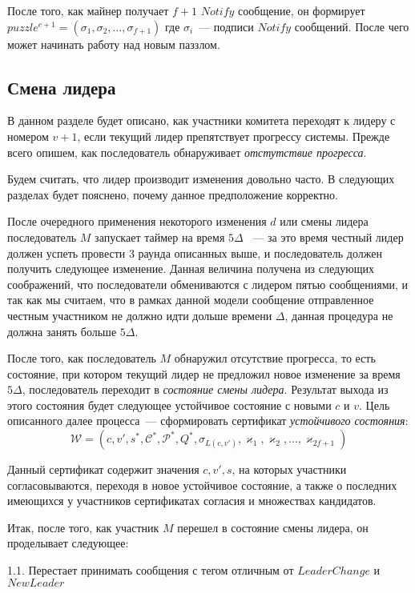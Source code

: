 После того, как майнер получает $f+1$ $Notify$ сообщение, он формирует
$puzzle^{c+1}=(\sigma_1, \sigma_2,..., \sigma_{f+1})$
где $\sigma_i$~--- подписи $Notify$ сообщений. После чего может начинать работу над новым паззлом.

\subsection{Смена лидера} \label{leader-change}
В данном разделе будет описано, как участники комитета переходят к лидеру с номером $v+1$, если текущий лидер препятствует прогрессу системы. Прежде всего опишем, как последователь обнаруживает \textit{отстутствие прогресса}.

Будем считать, что лидер производит изменения довольно часто. В следующих разделах будет пояснено, почему данное предположение корректно.

После очередного применения некоторого изменения $d$ или смены лидера последователь $M$ запускает таймер на время $5\Delta$ ~--- за это время честный лидер должен успеть провести 3 раунда описанных выше, и последователь должен получить следующее изменение.
Данная величина получена из следующих соображений, что последователи обмениваются с лидером пятью сообщениями, и так как мы считаем, что в рамках данной модели сообщение отправленное честным участником не должно идти дольше времени $\Delta$, данная процедура не должна занять больше $5\Delta$.

После того, как последователь $M$ обнаружил отсутствие прогресса, то есть состояние, при котором текущий лидер не предложил новое изменение за время $5\Delta$, последователь переходит в \textit{состояние смены лидера}.
Результат выхода из этого состояния будет следующее устойчивое состояние с новыми $c$ и $v$.
Цель описанного далее процесса~--- сформировать сертификат \textit{устойчивого состояния}:
$$\mathcal{W}=(c, v', s^{*}, \mathcal{C}^{*}, \mathcal{P}^{*}, Q^{*}, \sigma_{L(c, v')}, \varkappa_1, \varkappa_2,..., \varkappa_{2f+1})$$

Данный сертификат содержит значения $c, v', s$, на которых участники согласовываются, переходя в новое устойчивое состояние, а также о последних имеющихся у участников сертификатах согласия и множествах кандидатов.

Итак, после того, как участник $M$ перешел в состояние смены лидера, он проделывает следующее:

1.1. Перестает принимать сообщения с тегом отличным от $LeaderChange$ и $NewLeader$

